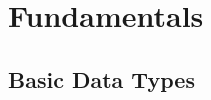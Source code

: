 %
%
% 
% 
% 
% 
% 

%
%

\chapter{Fundamentals}
\label{sec:fundamentals}

\section{Basic Data Types}

